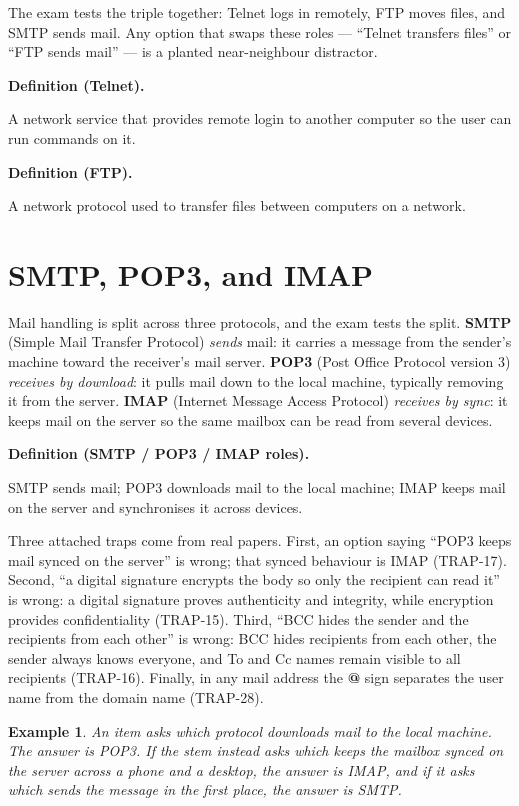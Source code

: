 \documentclass[11pt]{article}
\newtheorem{example}{Example}[section]
\newenvironment{definitionbox}[1]{%
  \par\noindent\textbf{Definition (#1).}\ \itshape
}{\par\vspace{0.3em}}
\begin{document}
The exam tests the triple together: Telnet logs in remotely, FTP moves files,
and SMTP sends mail. Any option that swaps these roles --- ``Telnet transfers
files'' or ``FTP sends mail'' --- is a planted near-neighbour distractor.

\begin{definitionbox}{Telnet}
A network service that provides remote login to another computer so the user
can run commands on it.
\end{definitionbox}

\begin{definitionbox}{FTP}
A network protocol used to transfer files between computers on a network.
\end{definitionbox}

\section{SMTP, POP3, and IMAP}
Mail handling is split across three protocols, and the exam tests the split.
\textbf{SMTP} (Simple Mail Transfer Protocol) \emph{sends} mail: it carries a
message from the sender's machine toward the receiver's mail server.
\textbf{POP3} (Post Office Protocol version 3) \emph{receives by download}:
it pulls mail down to the local machine, typically removing it from the
server. \textbf{IMAP} (Internet Message Access Protocol) \emph{receives by
sync}: it keeps mail on the server so the same mailbox can be read from
several devices.

\begin{definitionbox}{SMTP / POP3 / IMAP roles}
SMTP sends mail; POP3 downloads mail to the local machine; IMAP keeps mail on
the server and synchronises it across devices.
\end{definitionbox}

Three attached traps come from real papers. First, an option saying
``POP3 keeps mail synced on the server'' is wrong; that synced behaviour is
IMAP (TRAP-17). Second, ``a digital signature encrypts the body so only the
recipient can read it'' is wrong: a digital signature proves authenticity and
integrity, while encryption provides confidentiality (TRAP-15). Third,
``BCC hides the sender and the recipients from each other'' is wrong: BCC
hides recipients from each other, the sender always knows everyone, and To
and Cc names remain visible to all recipients (TRAP-16). Finally, in any mail
address the \textbf{@} sign separates the user name from the domain name
(TRAP-28).

\begin{example}
An item asks which protocol downloads mail to the local machine. The answer
is POP3. If the stem instead asks which keeps the mailbox synced on the
server across a phone and a desktop, the answer is IMAP, and if it asks
which sends the message in the first place, the answer is SMTP.
\end{example}
\end{document}
